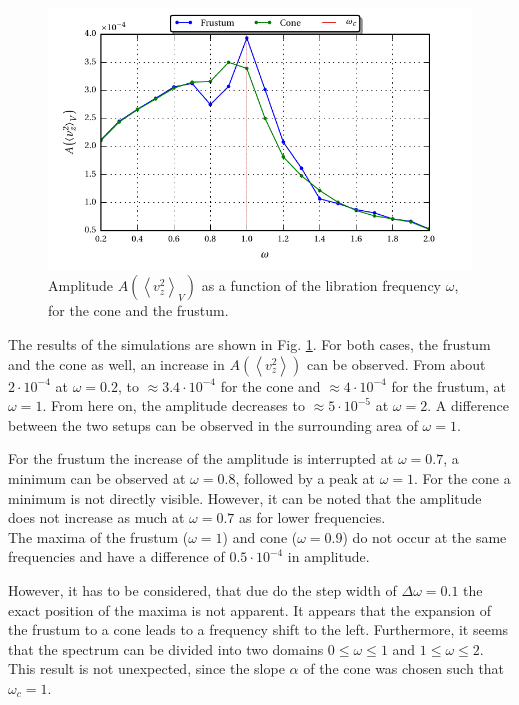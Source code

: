 \begin{figure}[!bp]
  \centering
  \includegraphics{gfx/cone/experiment/experiment.pdf}
  \caption{Amplitude $A\left(\left<v^2_z\right>_V\right)$ as a function of the libration frequency $\omega$,
            for the cone and the frustum.  \label{fig:cone_expseries} }
\end{figure}

The results of the simulations are shown in Fig. \ref{fig:cone_expseries}.
For both cases, the frustum and the cone as well, an increase in $A\left(\left<v^2_z\right>\right)$ can be observed.
From  about $2\cdot10^{-4}$ at $\omega=0.2$, to  $\approx 3.4\cdot10^{-4}$ for the cone and $\approx 4\cdot10^{-4}$ for the frustum,  at $\omega=1$.
From here on, the amplitude decreases to $\approx 5\cdot10^{-5}$ at $\omega=2$.
A difference between the two setups can be observed in the surrounding area of $\omega=1$.

For the frustum the increase of the amplitude is interrupted at $\omega=0.7$, a minimum can be observed at $\omega=0.8$, followed by
a peak at $\omega=1$. For the cone a minimum is not directly visible. However, it can be noted that the
amplitude does not increase as much at $\omega=0.7$ as for lower frequencies.\\
The maxima of the frustum ($\omega=1$) and cone ($\omega=0.9$) do not occur
at the same frequencies and have a difference of $0.5\cdot10^{-4}$ in amplitude.

However, it has to be considered, that due do the step width of $\Delta\omega = 0.1$ the exact position of the maxima is not apparent.
It appears that the expansion of the frustum to a cone leads to a frequency shift to the left.
Furthermore, it seems that the spectrum can be divided into two domains $0\leq\omega\leq1$ and $1 \leq \omega\leq 2$.
This result is not unexpected, since the slope $\alpha$ of the cone was chosen such that $\omega_c=1$.

